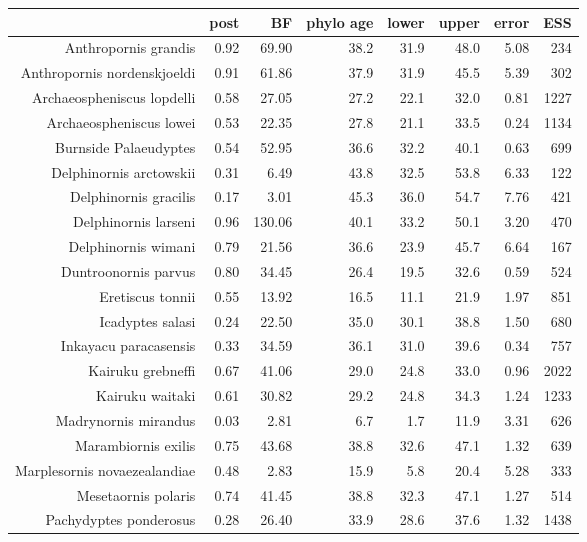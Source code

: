 \begin{table}[ht]
\centering
\footnotesize
\begin{tabular}{rrrrrrrr}
  \hline
 & post & BF & phylo age & lower & upper & error & ESS \\ 
  \hline
Anthropornis grandis & 0.92 & 69.90 & 38.2 & 31.9 & 48.0 & 5.08 & 234 \\ 
  Anthropornis nordenskjoeldi & 0.91 & 61.86 & 37.9 & 31.9 & 45.5 & 5.39 & 302 \\ 
  Archaeospheniscus lopdelli & 0.58 & 27.05 & 27.2 & 22.1 & 32.0 & 0.81 & 1227 \\ 
  Archaeospheniscus lowei & 0.53 & 22.35 & 27.8 & 21.1 & 33.5 & 0.24 & 1134 \\ 
  Burnside Palaeudyptes & 0.54 & 52.95 & 36.6 & 32.2 & 40.1 & 0.63 & 699 \\ 
  Delphinornis arctowskii & 0.31 & 6.49 & 43.8 & 32.5 & 53.8 & 6.33 & 122 \\ 
  Delphinornis gracilis & 0.17 & 3.01 & 45.3 & 36.0 & 54.7 & 7.76 & 421 \\ 
  Delphinornis larseni & 0.96 & 130.06 & 40.1 & 33.2 & 50.1 & 3.20 & 470 \\ 
  Delphinornis wimani & 0.79 & 21.56 & 36.6 & 23.9 & 45.7 & 6.64 & 167 \\ 
  Duntroonornis parvus & 0.80 & 34.45 & 26.4 & 19.5 & 32.6 & 0.59 & 524 \\ 
  Eretiscus tonnii & 0.55 & 13.92 & 16.5 & 11.1 & 21.9 & 1.97 & 851 \\ 
  Icadyptes salasi & 0.24 & 22.50 & 35.0 & 30.1 & 38.8 & 1.50 & 680 \\ 
  Inkayacu paracasensis & 0.33 & 34.59 & 36.1 & 31.0 & 39.6 & 0.34 & 757 \\ 
  Kairuku grebneffi & 0.67 & 41.06 & 29.0 & 24.8 & 33.0 & 0.96 & 2022 \\ 
  Kairuku waitaki & 0.61 & 30.82 & 29.2 & 24.8 & 34.3 & 1.24 & 1233 \\ 
  Madrynornis mirandus & 0.03 & 2.81 & 6.7 & 1.7 & 11.9 & 3.31 & 626 \\ 
  Marambiornis exilis & 0.75 & 43.68 & 38.8 & 32.6 & 47.1 & 1.32 & 639 \\ 
  Marplesornis novaezealandiae & 0.48 & 2.83 & 15.9 & 5.8 & 20.4 & 5.28 & 333 \\ 
  Mesetaornis polaris & 0.74 & 41.45 & 38.8 & 32.3 & 47.1 & 1.27 & 514 \\ 
  Pachydyptes ponderosus & 0.28 & 26.40 & 33.9 & 28.6 & 37.6 & 1.32 & 1438 \\ 

\end{tabular}
\end{table}
